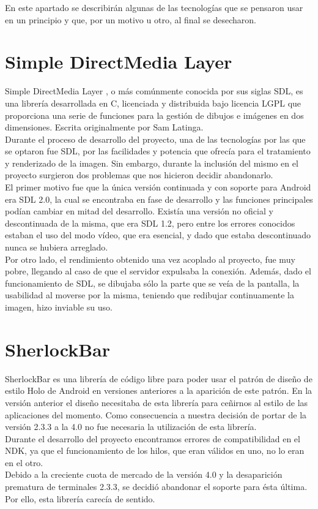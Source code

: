 En este apartado se describirán algunas de las tecnologías que se pensaron usar en un principio y que, por un motivo u otro, al final se desecharon.

\section{Simple DirectMedia Layer}

Simple DirectMedia Layer \cite{sdl:sdl}\cite{sdl2:sdl2}, o más comúnmente conocida por sus siglas SDL, es una librería desarrollada en C, licenciada y distribuida bajo licencia LGPL que proporciona una serie de funciones para la gestión de dibujos e imágenes en dos dimensiones. Escrita originalmente por Sam Latinga.\\

Durante el proceso de desarrollo del proyecto, una de las tecnologías por las que se optaron fue SDL, por las facilidades y potencia que ofrecía para el tratamiento y renderizado de la imagen. Sin embargo, durante la inclusión del mismo en el proyecto surgieron dos problemas que nos hicieron decidir abandonarlo.\\

El primer motivo fue que la única versión continuada y con soporte para Android era SDL 2.0, la cual se encontraba en fase de desarrollo y las funciones principales podían cambiar en mitad del desarrollo. Existía una versión no oficial y descontinuada de la misma, que era SDL 1.2, pero entre los errores conocidos estaban el uso del modo vídeo, que era esencial, y dado que estaba descontinuado nunca se hubiera arreglado.\\

Por otro lado, el rendimiento obtenido una vez acoplado al proyecto, fue muy pobre, llegando al caso de que el servidor expulsaba la conexión. Además, dado el funcionamiento de SDL, se dibujaba sólo la parte que se veía de la pantalla, la usabilidad al moverse por la misma, teniendo que redibujar continuamente la imagen, hizo inviable su uso.
\newpage
\section{SherlockBar}

SherlockBar \cite{sherlock:sherlock} es una librería de código libre para poder usar el patrón de diseño de estilo Holo de Android en versiones anteriores a la aparición de este patrón. En la versión anterior el diseño necesitaba de esta librería para ceñirnos al estilo de las aplicaciones del momento. Como consecuencia a nuestra decisión de portar de la versión 2.3.3 a la 4.0 no fue necesaria la utilización de esta librería.\\

Durante el desarrollo del proyecto encontramos errores de compatibilidad en el NDK, ya que el funcionamiento de los hilos, que eran válidos en uno, no lo eran en el otro.\\

Debido a la creciente cuota de mercado de la versión 4.0 y la desaparición prematura de terminales 2.3.3, se decidió abandonar el soporte para ésta última. Por ello, esta librería carecía de sentido. 

